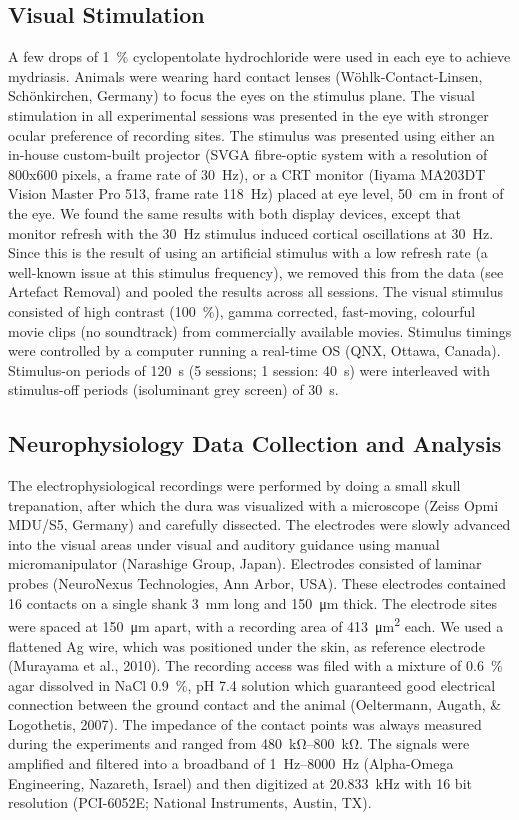 \subsection{Visual Stimulation}
A few drops of \SI{1}{\percent} cyclopentolate hydrochloride were used in each eye to achieve mydriasis.
Animals were wearing hard contact lenses (W\"ohlk-Contact-Linsen, Sch\"onkirchen, Germany) to focus the eyes on the stimulus plane.
The visual stimulation in all experimental sessions was presented in the eye with stronger ocular preference of recording sites.
The stimulus was presented using either an in-house custom-built projector (SVGA fibre-optic system with a resolution of 800x600 pixels, a frame rate of \SI{30}{Hz}), or a CRT monitor (Iiyama MA203DT Vision Master Pro 513, frame rate \SI{118}{Hz}) placed at eye level, \SI{50}{\centi\metre} in front of the eye.
We found the same results with both display devices, except that monitor refresh with the \SI{30}{Hz} stimulus induced cortical oscillations at \SI{30}{Hz}.
Since this is the result of using an artificial stimulus with a low refresh rate (a well-known issue at this stimulus frequency), we removed this from the data (see Artefact Removal) and pooled the results across all sessions.
The visual stimulus consisted of high contrast (\SI{100}{\percent}), gamma corrected, fast-moving, colourful movie clips (no soundtrack) from commercially available movies.
Stimulus timings were controlled by a computer running a real-time OS (QNX, Ottawa, Canada).
Stimulus-on periods of \SI{120}{s} (5 sessions; 1 session: \SI{40}{s}) were interleaved with stimulus-off periods (isoluminant grey screen) of \SI{30}{s}.


\subsection{Neurophysiology Data Collection and Analysis}
The electrophysiological recordings were performed by doing a small skull trepanation, after which the dura was visualized with a microscope (Zeiss Opmi MDU/S5, Germany) and carefully dissected.
The electrodes were slowly advanced into the visual areas under visual and auditory guidance using manual micromanipulator (Narashige Group, Japan).
Electrodes consisted of laminar probes (NeuroNexus Technologies, Ann Arbor, USA).
These electrodes contained 16 contacts on a single shank \SI{3}{\milli\metre} long and \SI{150}{\micro\metre} thick.
The electrode sites were spaced at \SI{150}{\micro\metre} apart, with a recording area of \SI{413}{\micro\metre^2} each.
We used a flattened \ac{Ag} wire, which was positioned under the skin, as reference electrode (Murayama et al., 2010).
The recording access was filed with a mixture of \SI{0.6}{\percent} agar dissolved in \ac{NaCl} \SI{0.9}{\percent}, pH 7.4 solution which guaranteed good electrical connection between the ground contact and the animal (Oeltermann, Augath, \& Logothetis, 2007).
The impedance of the contact points was always measured during the experiments and ranged from \SIrange{480}{800}{\kilo\ohm}.
The signals were amplified and filtered into a broadband of \SIrange{1}{8000}{Hz} (Alpha-Omega Engineering, Nazareth, Israel) and then digitized at \SI{20.833}{\kilo\Hz} with 16 bit resolution (PCI-6052E; National Instruments, Austin, TX).

